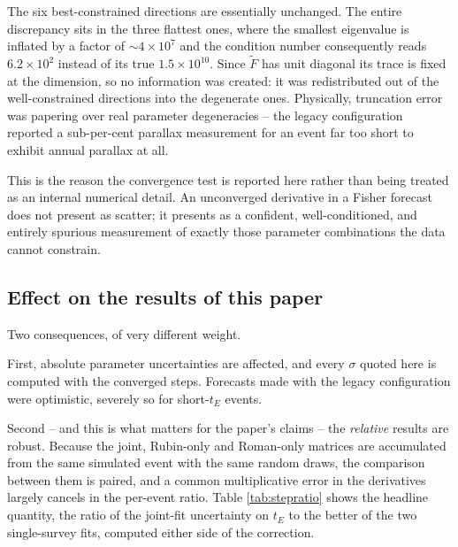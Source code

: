 \noindent The six best-constrained directions are essentially unchanged. The entire discrepancy
sits in the three flattest ones, where the smallest eigenvalue is inflated by a factor of
$\sim\!4\times10^{7}$ and the condition number consequently reads $6.2\times10^{2}$ instead of its
true $1.5\times10^{10}$. Since $\tilde{F}$ has unit diagonal its trace is fixed at the dimension,
so no information was created: it was redistributed out of the well-constrained directions into
the degenerate ones. Physically, truncation error was papering over real parameter degeneracies --
the legacy configuration reported a sub-per-cent parallax measurement for an event far too short
to exhibit annual parallax at all.

This is the reason the convergence test is reported here rather than being treated as an internal
numerical detail. An unconverged derivative in a Fisher forecast does not present as scatter; it
presents as a confident, well-conditioned, and entirely spurious measurement of exactly those
parameter combinations the data cannot constrain.

\subsection{Effect on the results of this paper}
\label{app:stepsize_impact}

Two consequences, of very different weight.

First, absolute parameter uncertainties are affected, and every $\sigma$ quoted here is computed
with the converged steps. Forecasts made with the legacy configuration were optimistic, severely so
for short-$t_E$ events.

Second -- and this is what matters for the paper's claims -- the \emph{relative} results are
robust. Because the joint, Rubin-only and Roman-only matrices are accumulated from the same
simulated event with the same random draws, the comparison between them is paired, and a common
multiplicative error in the derivatives largely cancels in the per-event ratio. Table
\ref{tab:stepratio} shows the headline quantity, the ratio of the joint-fit uncertainty on $t_E$ to
the better of the two single-survey fits, computed either side of the correction.

